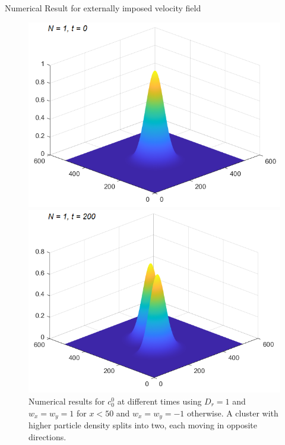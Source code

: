\begin{frame}{Numerical Result for externally imposed velocity field}
	\scriptsize
	\begin{figure}[H]
	\centering
	 \begin{minipage}{0.4\textwidth}
	 \includegraphics[scale=0.3]{Bilder_wxwy/t=0_wxwy=1_wxwy=-1}
     \end{minipage}
     \hfill 
     \begin{minipage}{0.4\textwidth}
	   \includegraphics[scale=0.3]{Bilder_wxwy/t=200_wxwy=1_wxwy=-1}
     \end{minipage}
     \caption{Numerical results for $c^0_0$ at different times using $D_r=1$ and $w_x=w_y=1$ for $x<50$ and $w_x=w_y=-1$ otherwise. A cluster with higher particle density splits into two, each moving in opposite directions.}
    \end{figure}
\end{frame}



